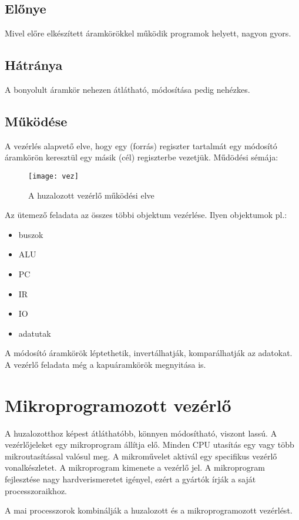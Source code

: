 \subsection{Előnye}
Mivel előre elkészített áramkörökkel működik programok helyett, nagyon gyors.

\subsection{Hátránya}
A bonyolult áramkör nehezen átlátható, módosítása pedig nehézkes.

\subsection{Működése}
A vezérlés alapvető elve, hogy egy (forrás) regiszter tartalmát egy módosító áramkörön keresztül egy másik (cél) regiszterbe vezetjük.
Műdödési sémája:
\begin{figure}[H]
    \texttt{[image: vez]}
    \centering
    \caption{A huzalozott vezérlő működési elve}
    \label{fig:vez}
\end{figure}
Az ütemező feladata az összes többi objektum vezérlése.
Ilyen objektumok pl.:
\begin{itemize}
    \item buszok
    \item ALU
    \item PC
    \item IR
    \item IO
    \item adatutak
\end{itemize}
A módosító áramkörök léptethetik, invertálhatják, komparálhatják az adatokat.
A vezérlő feladata még a kapuáramkörök megnyitása is. 

\section{Mikroprogramozott vezérlő}
A huzalozotthoz képest átláthatóbb, könnyen módosítható, viszont lassú.
A vezérlőjeleket egy mikroprogram állítja elő.
Minden CPU utasítás egy vagy több mikroutasítással valósul meg.
A mikroművelet aktivál egy specifikus vezérlő vonalkészletet.
A mikroprogram kimenete a vezérlő jel.
A mikroprogram fejlesztése nagy hardverismeretet igényel, ezért a gyártók írják a saját processzoraikhoz.

A mai processzorok kombinálják a huzalozott és a mikroprogramozott vezérlést.
